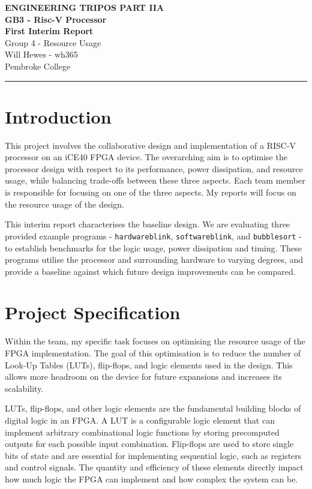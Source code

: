 \documentclass[a4paper,10pt]{article}
\renewcommand{\maketitle}{
    \begin{center}
        \LARGE \textbf{ENGINEERING TRIPOS PART IIA} \\ 
        \vspace{0.5em}
        \Large \textbf{GB3 - Risc-V Processor} \\ 
        \vspace{0.5em}
        \textbf{First Interim Report} \\
        \large Group 4 - Resource Usage \\
        \vspace{1em}
        \large Will Hewes - wh365 \\ 
        Pembroke College \\ 
        \vspace{0.5em}
    \end{center}
}
\begin{document}
\maketitle
\hrule
\tableofcontents
\newpage

\section{Introduction}
\label{sec:Introduction}

This project involves the collaborative design and implementation 
of a RISC-V processor on an iCE40 FPGA device. 
The overarching aim is to optimise 
the processor design with respect to its 
performance, power dissipation, and resource usage, 
while balancing trade-offs between these three aspects. 
Each team member is responsible for focusing on one of the three aspects.
My reports will focus on the resource usage of the design.

This interim report characterises the baseline design. 
We are evaluating three provided example programs - 
\texttt{hardwareblink}, \texttt{softwareblink}, and \texttt{bubblesort} - 
to establish benchmarks for the logic usage, power dissipation and timing. 
These programs utilise the processor and surrounding hardware to varying degrees, 
and provide a baseline against which future design improvements can be compared.


\section{Project Specification}
\label{sec:Project_Specification}

Within the team, my specific task focuses on 
optimising the resource usage of the FPGA implementation. 
The goal of this optimisation is to reduce the number of 
Look-Up Tables (LUTs), flip-flops, and logic elements used in the design. 
This allows more headroom on the device for future expansions 
and increases its scalability.

LUTs, flip-flops, and other logic elements are 
the fundamental building blocks of digital logic in an FPGA. 
A LUT is a configurable logic element that can implement 
arbitrary combinational logic functions 
by storing precomputed outputs for each possible input combination. 
Flip-flops are used to store single bits of state and 
are essential for implementing sequential logic, 
such as registers and control signals. 
The quantity and efficiency of these elements directly impact 
how much logic the FPGA can implement and how complex the system can be.
\end{document}
